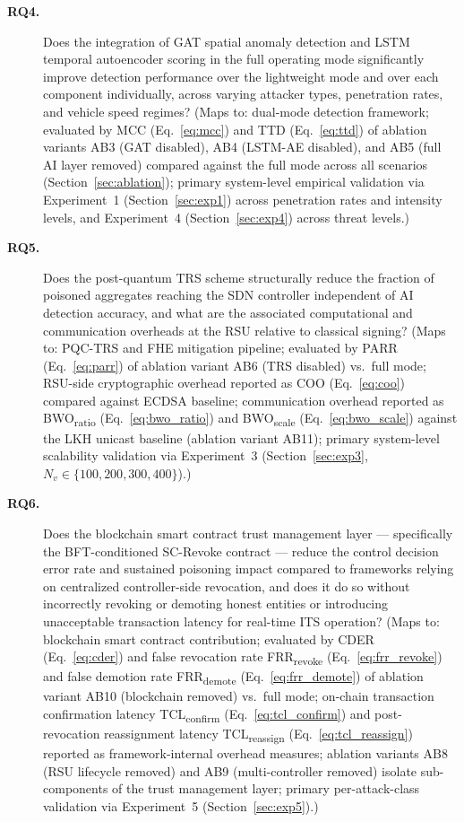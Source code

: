 \documentclass[12pt, a4paper]{report}
\begin{document}
\begin{description}
\item[\textbf{RQ4.}] Does the integration of GAT spatial anomaly detection
and LSTM temporal autoencoder scoring in the full operating mode
significantly improve detection performance over the lightweight mode
and over each component individually, across varying attacker types,
penetration rates, and vehicle speed regimes?
(Maps to: dual-mode detection framework; evaluated by MCC
(Eq.~\ref{eq:mcc}) and TTD (Eq.~\ref{eq:ttd}) of ablation variants
AB3 (GAT disabled), AB4 (LSTM-AE disabled), and AB5 (full AI layer
removed) compared against the full mode across all scenarios
(Section~\ref{sec:ablation}); primary system-level empirical
validation via Experiment~1 (Section~\ref{sec:exp1})
across penetration rates and intensity levels,
and Experiment~4 (Section~\ref{sec:exp4}) across threat levels.)

\item[\textbf{RQ5.}] Does the post-quantum TRS scheme structurally reduce
the fraction of poisoned aggregates reaching the SDN controller independent
of AI detection accuracy, and what are the associated computational and
communication overheads at the RSU relative to classical signing?
(Maps to: PQC-TRS and FHE mitigation pipeline; evaluated by
PARR (Eq.~\ref{eq:parr}) of ablation variant AB6 (TRS disabled)
vs.\ full mode; RSU-side cryptographic overhead reported as
COO (Eq.~\ref{eq:coo}) compared against ECDSA baseline;
communication overhead reported as BWO\textsubscript{ratio}
(Eq.~\ref{eq:bwo_ratio}) and BWO\textsubscript{scale}
(Eq.~\ref{eq:bwo_scale}) against the LKH unicast baseline
(ablation variant AB11); primary system-level scalability
validation via Experiment~3 (Section~\ref{sec:exp3},
$N_v \in \{100, 200, 300, 400\}$).)

\item[\textbf{RQ6.}] Does the blockchain smart contract trust management
layer --- specifically the BFT-conditioned SC-Revoke contract --- reduce
the control decision error rate and sustained poisoning impact compared to
frameworks relying on centralized controller-side revocation, and does it
do so without incorrectly revoking or demoting honest entities or
introducing unacceptable transaction latency for real-time ITS operation?
(Maps to: blockchain smart contract contribution; evaluated by
CDER (Eq.~\ref{eq:cder}) and false revocation rate
FRR\textsubscript{revoke} (Eq.~\ref{eq:frr_revoke}) and false
demotion rate FRR\textsubscript{demote} (Eq.~\ref{eq:frr_demote})
of ablation variant AB10 (blockchain removed) vs.\ full mode;
on-chain transaction confirmation latency
TCL\textsubscript{confirm} (Eq.~\ref{eq:tcl_confirm}) and
post-revocation reassignment latency
TCL\textsubscript{reassign} (Eq.~\ref{eq:tcl_reassign})
reported as framework-internal overhead measures; ablation
variants AB8 (RSU lifecycle removed) and AB9 (multi-controller
removed) isolate sub-components of the trust management layer;
primary per-attack-class validation via Experiment~5
(Section~\ref{sec:exp5}).)

\end{description}
\end{document}

